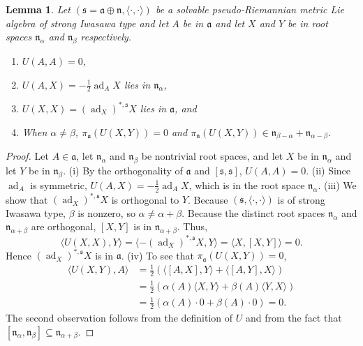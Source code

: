 \documentclass[12pt]{amsart}
\newcommand{\la}{\langle}
\newcommand{\ra}{\rangle}
\newcommand\op{{\oplus}}
\newcommand{\smallfrac}[2]{\textstyle{\frac{#1}{#2}}  }
\newcommand{\fraka}{\ensuremath{\mathfrak{a}} }
\newcommand{\frakn}{\ensuremath{\mathfrak{n}} }
\newcommand{\fraks}{\ensuremath{\mathfrak{s}} }
\renewcommand\a{{\mathfrak{a}}}
\newcommand\n{{\mathfrak{n}}}
\newcommand\s{{\mathfrak{s}}}
\newcommand\ip{{\langle\cdot {,} \cdot\rangle}}
\newcommand\ad{\operatorname{ad}}
\theoremstyle{plain}
\newtheorem{lemma}[theorem]{Lemma}
\theoremstyle{definition}
\theoremstyle{remark}
\numberwithin{equation}{section}
\numberwithin{theorem}{section}
\begin{document}
\begin{lemma}\label{lem: ad-starX-X in n}
Let $(\s=\a \op \n,\ip)$ be a solvable pseudo-Riemannian metric  
Lie algebra  of strong Iwasawa type and let $A$ be in $\fraka$ and let 
$X$ and $Y$ be in root spaces $\frakn_\alpha$ and $\frakn_\beta$ respectively.
\begin{enumerate}
    \item $U(A,A)=0$,
    \item $U(A,X)=-\smallfrac{1}{2} \ad_A X$ lies  in $\frakn_\alpha$, 
    \item $U(X,X)= (\ad_X)^{\ast,\fraks}X$ lies in $\fraka$, and
    \item When $\alpha \neq \beta$, $\pi_\fraka(U(X,Y))=0$ and $\pi_\frakn ( U(X,Y) ) \in \frakn_{\beta - \alpha} + \frakn_{\alpha - \beta}$.
\end{enumerate} 
 \end{lemma}
 \begin{proof}  Let $A \in \a$, let $\frakn_\alpha$ and $\frakn_\beta$ be nontrivial root spaces, and  let $X$ be in
   $\frakn_\alpha$ and let $Y$ be in $\frakn_\beta.$   
   (i)   By the orthogonality of $\a$ and $[\s,\s]$,  $U(A,A)=0$.
(ii) 
Since $\ad_A$ is symmetric, $U(A,X)=-\smallfrac{1}{2} \ad_A X$,  which is in the root
space $\frakn_\alpha$.
 (iii)   We show that $ (\ad_X)^{*,\fraks}X$ is orthogonal to $Y$.   Because 
 $(\s,\ip)$ is of strong Iwasawa type, $\beta$ is nonzero, so $\alpha \ne \alpha + \beta$.  
  Because the distinct root spaces $\frakn_{\alpha}$ and $\frakn_{\alpha+\beta}$ 
  are orthogonal, $[X,Y]$ is in $\frakn_{\alpha+\beta}$. Thus,
  \[ \la  U(X,X),Y \ra = \langle-(\ad_X)^{*,\fraks} X, Y\rangle = 
  \langle X,[X,Y]\rangle =0.\] Hence  $(\ad_X)^{*,\fraks}X$ is in $\fraka$.
  (iv) To see that $\pi_\fraka(U(X,Y))=0$,
\begin{align*}\la U(X,Y), A \ra &=\tfrac12 ( \la
[A,X],Y\ra +\la[A ,Y],X\ra) \\
&=\tfrac12(\alpha(A)\la X,Y\ra +\beta(A)\la Y,X\ra)
\\
&=\tfrac12(\alpha(A) \cdot 0  +\beta(A) \cdot 0 ) = 0.
\end{align*}
The second observation follows from the definition of $U$ and from the fact that $[\frakn_{\alpha}, \frakn_{\beta}] \subseteq\frakn_{\alpha + \beta}$.
\end{proof}
\end{document}
